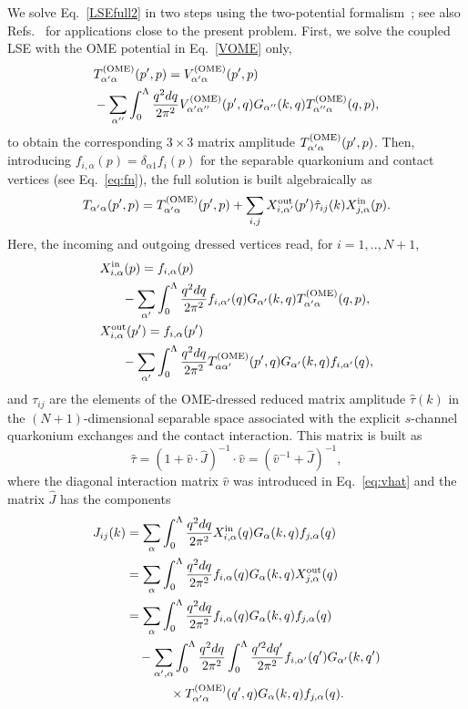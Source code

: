 \documentclass[aps,prd,showpacs,amsmath,twocolumn,superscriptaddress,floatfix,nofootinbib,notitlepage]{revtex4-2}
\newcommand{\be}{\begin{equation}}
\newcommand{\ee}{\end{equation}}
\newcommand{\dqr}{\frac{q^2dq}{2\pi^2}}
\newcommand{\dqrpr}{\frac{q^{\prime2}dq'}{2\pi^2}}
\newcommand{\VOME}{V^{\rm (OME)}}
\begin{document}
We solve Eq.~\eqref{LSEfull2} in two steps using the two-potential formalism~\cite{Gell-Mann:1953dcn,Nakano:1982bc}; see also Refs.~\cite{Doring:2009bi,Hanhart:2012wi} for applications close to the present problem. First, we solve the coupled LSE with the OME potential in Eq.~\eqref{VOME} only,
\begin{align}
&T^{\rm (OME)}_{\alpha'\alpha}(p',p)=\VOME_{\alpha'\alpha}(p',p)
\label{LSEOME}\\
&-\sum_{\alpha''}\int_0^\Lambda\frac{q^2dq}{2\pi^2}
\VOME_{\alpha'\alpha''}(p',q) G_{\alpha''}(k,q)
T^{\rm (OME)}_{\alpha''\alpha}(q,p),\notag
\end{align}
to obtain the corresponding $3\times3$ matrix amplitude $T^{\rm (OME)}_{\alpha'\alpha}(p',p)$.
Then, introducing $f_{i,\alpha}(p)=\delta_{\alpha 1}f_i(p)$ for the separable quarkonium and contact vertices (see Eq.~\eqref{eq:fn}), the full solution is built algebraically as
\begin{align}
T_{\alpha'\alpha}(p',p)= T^{\rm (OME)}_{\alpha'\alpha}(p',p)+\sum_{i,j}X^{{\rm out}}_{i,\alpha'}(p')\hat{\tau}_{ij}(k)
X^{{\rm in}}_{j,\alpha}(p).
\label{Tsol}
\end{align}
Here, the incoming and outgoing dressed vertices read, for $i=1,..,N+1$,
\be
\begin{split}
&X_{i,\alpha}^{{\rm in}}(p)=f_{i,\alpha}(p)\\
&\hspace*{0.05\columnwidth}-\sum_{\alpha'}\int_0^\Lambda\dqr f_{i,\alpha'}(q)G_{\alpha'}(k,q) T^{\rm (OME)}_{\alpha'\alpha}(q,p),\\
&X_{i,\alpha}^{{\rm out}}(p')=f_{i,\alpha}(p')\\
& \hspace*{0.05\columnwidth}-\sum_{\alpha'}\int_0^\Lambda\dqr T^{\rm (OME)}_{\alpha\alpha'}(p',q)G_{\alpha'}(k,q) f_{i,\alpha'}(q),
\end{split}
\label{Xs}
\ee
and $\tau_{ij}$ are the elements of
the OME-dressed reduced matrix amplitude $\hat{\tau}(k)$ in the $(N+1)$-dimensional separable space associated with the explicit $s$-channel quarkonium exchanges and the contact interaction. This matrix is built as
\be
\hat{\tau}=\left(1+
\hat{v}\cdot\hat{J}\right)^{-1}\cdot \hat{v}=\left(\hat{v}^{-1}+\hat{J}\right)^{-1},
\label{eq:tau}
\ee 
where the diagonal interaction matrix $\hat{v}$ was introduced in Eq.~\eqref{eq:vhat} and the matrix $\hat{J}$ has the components
\begin{align}
J_{ij}(k)
&=\sum_\alpha\int_0^\Lambda\dqr X_{i,\alpha}^{{\rm in}}(q)G_\alpha(k,q)f_{j,\alpha}(q)\notag\\
&=\sum_\alpha\int_0^\Lambda\dqr f_{i,\alpha}(q)G_\alpha(k,q)X_{j,\alpha}^{{\rm out}}(q)\notag\\
&=\sum_\alpha\int_0^\Lambda\dqr f_{i,\alpha}(q)G_\alpha(k,q)f_{j,\alpha}(q)\label{Mdef}\\
&\quad-\sum_{\alpha',\alpha}\int_0^\Lambda\dqr\int_0^\Lambda\dqrpr
f_{i,\alpha'}(q')G_{\alpha'}(k,q')\notag\\
&\hspace*{0.10\columnwidth}\times
T^{\rm (OME)}_{\alpha'\alpha}(q',q)G_\alpha(k,q)f_{j,\alpha}(q).\notag
\end{align}
\end{document}
